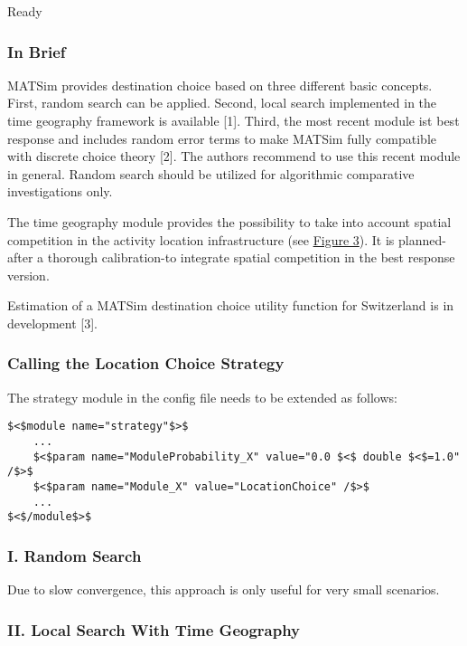 Ready

\subsubsection{{In Brief}}

MATSim provides destination choice based on three  different basic concepts. First, random search can be applied. Second,  local search implemented in the time geography framework is available  [1]. Third, the most recent module ist best response and includes random  error terms to make MATSim fully compatible with discrete choice theory  [2]. The authors recommend to use this recent module in general. Random  search should be utilized for algorithmic comparative investigations  only.

The time geography module provides the possibility to  take into account spatial competition in the activity location  infrastructure (see \hyperlink{Figure3}{Figure 3}). It is planned-after a thorough calibration-to integrate spatial competition in the best response version.

Estimation of a MATSim destination choice utility function for Switzerland is in development [3].




\subsubsection{{Calling the Location Choice Strategy}}

The strategy module in the config file needs to be extended as follows:
\begin{verbatim}
$<$module name="strategy"$>$
    ...
    $<$param name="ModuleProbability_X" value="0.0 $<$ double $<$=1.0" /$>$
    $<$param name="Module_X" value="LocationChoice" /$>$
    ...
$<$/module$>$
\end{verbatim}


\subsubsection{{I. Random Search}}

Due to slow convergence, this approach is only useful for very small scenarios.


\subsubsection{{II. Local Search With Time Geography}}

